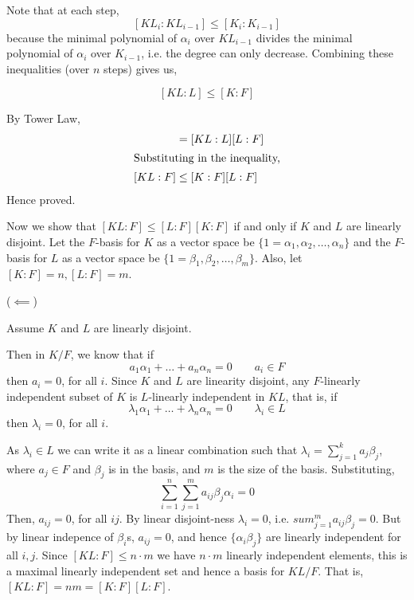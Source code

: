 \documentclass[12pt]{article}
\begin{document}
\begin{solution}
\begin{enumerate}
        Note that at each step, 
        \[[KL_{i}: KL_{i-1}] \leq [K_{i}: K_{i-1}] \]
        because the minimal polynomial of $\alpha_i$ over $KL_{i-1}$ divides the minimal polynomial of $\alpha_i$ over $K_{i-1}$, i.e. the degree can only decrease.  
        Combining these inequalities (over $n$ steps) gives us, 

        \[[KL: L] \leq [K: F] \]

        By Tower Law, 
        \begin{align*}
            [KL:F] &= [KL:L][L:F] \\ 
            \intertext{Substituting in the inequality,}
            [KL:F] &\leq [K:F][L:F] 
        \end{align*}
        Hence proved. 

        Now we show that $[KL:F] \leq [L:F][K:F]$ if and only if $K$ and $L$ are linearly disjoint. 
        Let the $F$-basis for $K$ as a vector space be $\{1 = \alpha_1, \alpha_2, \ldots, \alpha_n\}$ and the $F$-basis for $L$ as a vector space be $\{1 = \beta_1, \beta_2, \ldots, \beta_m\}$. Also, let $[K:F] = n, [L:F] = m$.
        

        ($\impliedby$) 

        Assume $K$ and $L$ are linearly disjoint. 
        
        Then in $K/F$, we know that if 
        \[a_1 \alpha_1 + \ldots + a_n\alpha_n = 0 \qquad a_i \in F\]
        then $a_i = 0$, for all $i$. 
        Since $K$ and $L$ are linearity disjoint, any $F$-linearly independent subset of $K$ is $L$-linearly independent in $KL$, that is, if 
        \[\lambda_1 \alpha_1 + \ldots + \lambda_n\alpha_n = 0 \qquad \lambda_i \in L\]
        then $\lambda_i = 0$, for all $i$. 

        As $\lambda_i \in L$ we can write it as a linear combination such that $\lambda_i = \sum_{j=1}^{k}a_j\beta_j$, where $a_j \in F$ and $\beta_j$ is in the basis, and $m$ is the size of the basis. Substituting, 
        \[\sum_{i=1}^n\sum_{j=1}^{m}a_{ij}\beta_j \alpha_i = 0\]
        Then, $a_{ij} = 0$, for all $ij$. By linear disjoint-ness $\lambda_i = 0$, i.e. $sum_{j=1}^{m}a_{ij}\beta_j = 0$. But by linear indepence of $\beta_i$s, $a_{ij} = 0$, and hence $\{\alpha_i \beta_j\}$ are linearly independent for all $i, j$. Since $[KL:F] \leq n \cdot m$  we have $n\cdot m$ linearly independent elements, this is a maximal linearly independent set and hence a basis for $KL/F$. That is, $[KL:F] = nm = [K:F][L:F]$. 

        \bbni


\end{enumerate}
\end{solution}
\end{document}
